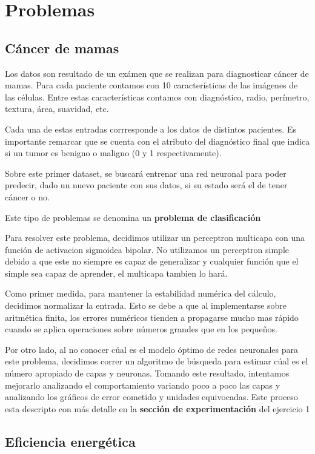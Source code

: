 \section{Problemas}
\subsection{Cáncer de mamas}
Los datos son resultado de un exámen que se realizan para diagnosticar cáncer de mamas. Para cada paciente contamos con 10 características de las imágenes de las células. Entre estas características contamos con diagnóstico, radio, perímetro, textura, área, suavidad, etc. 

Cada una de estas entradas corrresponde a los datos de distintos pacientes. Es importante remarcar que se cuenta con el atributo del diagnóstico final que indica si un tumor es benigno o maligno (0 y 1 respectivamente).

Sobre este primer dataset, se buscará entrenar una red neuronal para poder predecir, dado un nuevo paciente con sus datos, si su estado será el de tener cáncer o no.

Este tipo de problemas se denomina un \textbf{problema de clasificación}

Para resolver este problema, decidimos utilizar un perceptron multicapa con una función de activacion sigmoidea bipolar. No utilizamos un perceptron simple debido a que este no siempre es capaz de generalizar y cualquier función que el simple sea capaz de aprender, el multicapa tambien lo hará.

Como primer medida, para mantener la estabilidad numérica del cálculo, decidimos normalizar la entrada. Esto se debe a que al implementarse sobre aritmética finita, los errores numéricos tienden a propagarse mucho mas rápido cuando se aplica operaciones sobre números grandes que en los pequeños.

Por otro lado, al no conocer cúal es el modelo óptimo de redes neuronales para este problema, decidimos correr un algoritmo de búsqueda para estimar cúal es el número apropiado de capas y neuronas. Tomando este resultado, intentamos mejorarlo analizando el comportamiento variando poco a poco las capas y analizando los gráficos de error cometido y unidades equivocadas. Este proceso esta descripto con más detalle en la \textbf{sección de experimentación} del ejercicio 1

\subsection{Eficiencia energética}

